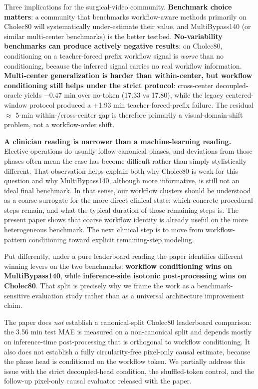 Three implications for the surgical-video community. \textbf{Benchmark
choice matters}: a community that benchmarks workflow-aware methods
primarily on Cholec80 will systematically under-estimate their value,
and MultiBypass140 (or similar multi-center benchmarks) is the better
testbed. \textbf{No-variability benchmarks can produce actively negative
results}: on Cholec80, conditioning on a teacher-forced prefix workflow
signal is \emph{worse} than no conditioning, because the inferred signal
carries no real workflow information. \textbf{Multi-center
generalization is harder than within-center, but workflow conditioning
still helps under the strict protocol}: cross-center decoupled-oracle
yields $-$0.47 min over no-token (17.33 vs 17.80), while the legacy
centered-window protocol produced a +1.93 min teacher-forced-prefix
failure. The residual $\approx$ 5-min
within-/cross-center gap is therefore primarily a visual-domain-shift
problem, not a workflow-order shift.

\textbf{A clinician reading is narrower than a machine-learning
reading.} Elective operations do usually follow canonical phases, and
deviations from those phases often mean the case has become difficult
rather than simply stylistically different. That observation helps
explain both why Cholec80 is weak for this question and why
MultiBypass140, although more informative, is still not an ideal final
benchmark. In that sense, our workflow clusters should be understood as
a coarse surrogate for the more direct clinical state: which concrete
procedural steps remain, and what the typical duration of those
remaining steps is. The present paper shows that coarse workflow
identity is already useful on the more heterogeneous benchmark. The next
clinical step is to move from workflow-pattern conditioning toward
explicit remaining-step modeling.

Put differently, under a pure leaderboard reading the paper identifies
different winning levers on the two benchmarks: \textbf{workflow
conditioning wins on MultiBypass140}, while \textbf{inference-side
isotonic post-processing wins on Cholec80}. That split is precisely why
we frame the work as a benchmark-sensitive evaluation study rather than
as a universal architecture improvement claim.

The paper does \emph{not} establish a canonical-split Cholec80
leaderboard comparison: the 3.56 min test MAE is measured on a
non-canonical split and depends mostly on inference-time post-processing
that is orthogonal to workflow conditioning. It also does not establish a
fully circularity-free pixel-only causal estimate, because the phase head
is conditioned on the workflow token. We partially address this issue
with the strict decoupled-head condition, the shuffled-token control, and
the follow-up pixel-only causal evaluator released with the paper.
